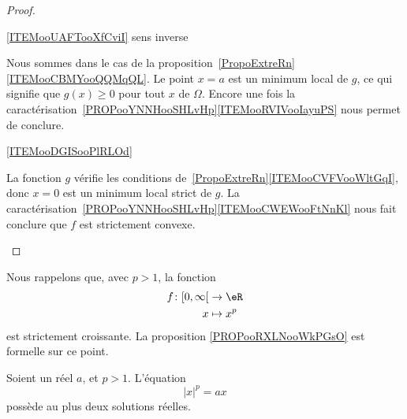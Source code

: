 \begin{proof}
\begin{subproof}
        \item[\ref{ITEMooUAFTooXfCviI} sens inverse]

            Nous sommes dans le cas de la proposition~\ref{PropoExtreRn}\ref{ITEMooCBMYooQQMqQL}. Le point \( x=a\) est un minimum local de \( g\), ce qui signifie que \( g(x)\geq 0\) pour tout \( x\) de \( \Omega\). Encore une fois la caractérisation~\ref{PROPooYNNHooSHLvHp}\ref{ITEMooRVIVooIayuPS} nous permet de conclure.

        \item[\ref{ITEMooDGISooPlRLOd}]

            La fonction \( g\) vérifie les conditions de~\ref{PropoExtreRn}\ref{ITEMooCVFVooWltGqI}, donc \( x=0\) est un minimum local strict de \( g\). La caractérisation~\ref{PROPooYNNHooSHLvHp}\ref{ITEMooCWEWooFtNnKl} nous fait conclure que \( f\) est strictement convexe.

    \end{subproof}
\end{proof}

\begin{normaltext}
    Nous rappelons que, avec \( p>1\), la fonction
    \begin{equation}
        \begin{aligned}
            f\colon \mathopen[ 0 , \infty \mathclose[ & \to \eR       \\
                                x                     & \mapsto x^p
        \end{aligned}
    \end{equation}
    est strictement croissante. La proposition \ref{PROPooRXLNooWkPGsO} est formelle sur ce point.
\end{normaltext}

\begin{lemma}
    Soient un réel \( a\), et \( p>1\). L'équation
    \begin{equation}
        | x |^p=ax
    \end{equation}
    possède au plus deux solutions réelles.
\end{lemma}


